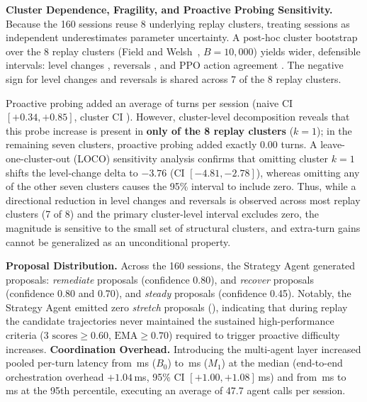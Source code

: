 \noindent\textbf{Cluster Dependence, Fragility, and Proactive Probing Sensitivity.} Because the 160 sessions reuse 8 underlying replay clusters, treating sessions as independent underestimates parameter uncertainty. A post-hoc cluster bootstrap over the 8 replay clusters (Field and Welsh~\cite{fw07}, $B = 10{,}000$) yields wider, defensible intervals: level changes \phchgmean{} \phchgci{}, reversals \phrevmean{} \phrevci{}, and PPO action agreement \phagrmean{} \phagrci{}. The negative sign for level changes and reversals is shared across 7 of the 8 replay clusters.

Proactive probing added an average of \phfumean{} turns per session (naive CI $[+0.34, +0.85]$, cluster CI \phfuci{}). However, cluster-level decomposition reveals that this probe increase is present in \textbf{only \phfusame{} of the 8 replay clusters} ($k=1$); in the remaining seven clusters, proactive probing added exactly 0.00 turns. A leave-one-cluster-out (LOCO) sensitivity analysis confirms that omitting cluster $k=1$ shifts the level-change delta to $-3.76$ (CI $[-4.81, -2.78]$), whereas omitting any of the other seven clusters causes the 95\% interval to include zero. Thus, while a directional reduction in level changes and reversals is observed across most replay clusters (7 of 8) and the primary cluster-level interval excludes zero, the magnitude is sensitive to the small set of structural clusters, and extra-turn gains cannot be generalized as an unconditional property.

\noindent\textbf{Proposal Distribution.} Across the 160 sessions, the Strategy Agent generated \scTotal{} proposals: \scRemEight{} \emph{remediate} proposals (confidence 0.80), \scRecEight{} and \scRecSeven{} \emph{recover} proposals (confidence 0.80 and 0.70), and \scSteady{} \emph{steady} proposals (confidence 0.45). Notably, the Strategy Agent emitted zero \emph{stretch} proposals (\scStretch{}), indicating that during replay the candidate trajectories never maintained the sustained high-performance criteria ($3\text{ scores} \ge 0.60$, $\text{EMA} \ge 0.70$) required to trigger proactive difficulty increases.
\noindent\textbf{Coordination Overhead.} Introducing the multi-agent layer increased pooled per-turn latency from \xaBzeroMed{}\,ms ($B_0$) to \xaMoneMed{}\,ms ($M_1$) at the median (end-to-end orchestration overhead $+1.04$\,ms, 95\% CI $[+1.00, +1.08]$\,ms) and from \xaBzeroHigh{}\,ms to \xaMoneHigh{}\,ms at the 95th percentile, executing an average of 47.7 agent calls per session.


